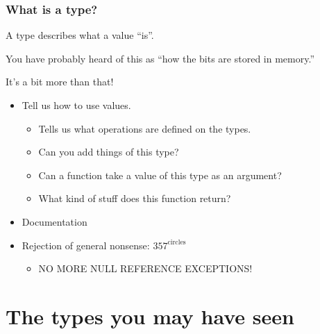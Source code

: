 \documentclass{beamer}
\begin{document}
\begin{frame}
  \frametitle{What is a type?}

  A type describes what a value ``is''.

  \pause

  You have probably heard of this as ``how the bits are stored in memory.''

  \pause

  It's a bit more than that!

  \pause

  \begin{itemize}
  \item Tell us how to use values.
    \pause

    \begin{itemize}
    \item Tells us what operations are defined on the types.
    \item Can you add things of this type?
    \item Can a function take a value of this type as an argument?
    \item What kind of stuff does this function return?
    \end{itemize}

  \pause

  \item Documentation

  \pause

  \item Rejection of general nonsense: \(357^\text{circles}\)

  \pause

  \begin{itemize}
  \item \huge{NO MORE NULL REFERENCE EXCEPTIONS!}
  \end{itemize}
  \end{itemize}
\end{frame}

\section{The types you may have seen}
\end{document}
